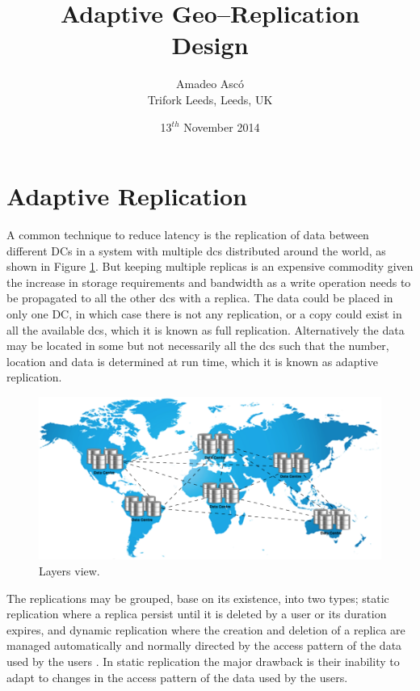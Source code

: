 \documentclass[english]{article}
\begin{document}
\title{Adaptive Geo--Replication\\Design}

\author{Amadeo Asc\'{o}\\ Trifork Leeds, Leeds, UK}

\date{13$^{th}$ November 2014}

\maketitle


\section{Adaptive Replication}
A common technique to reduce latency is the replication of data between different DCs in a system with multiple \glspl{dc} distributed around the world, as shown in Figure \ref{fig:full_replication}. But keeping multiple replicas is an expensive commodity given the increase in storage requirements and bandwidth as a write operation needs to be propagated to all the other \glspl{dc} with a replica. The data could be placed in only one DC, in which case there is not any replication, or a copy could exist in all the available \glspl{dc}, which it is known as full replication. Alternatively the data may be located in some but not necessarily all the \glspl{dc} such that the number, location and data is determined at run time, which it is known as adaptive replication.
\begin{figure}[ht!]
	\centering
	\includegraphics[width=1\textwidth]{multiDCs.png}
	
	\caption{Layers view.}
	\label{fig:full_replication}
\end{figure}

The replications may be grouped, base on its existence, into two types; static replication where a replica persist until it is deleted by a user or its duration expires, and dynamic replication where the creation and deletion of a replica are managed automatically and normally directed by the access pattern of the data used by the users \cite{Dong2008a}. In static replication the major drawback is their inability to adapt to changes in the access pattern of the data used by the users.
\end{document}
